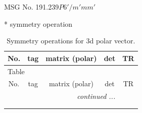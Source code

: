 \documentclass[fleqn,8pt]{jsarticle}
\begin{document}
\setcounter{MaxMatrixCols}{32}

\renewcommand{\tablename}{Table~}
\renewcommand{\figurename}{Figure~}
\begin{center}
\LARGE
MSG No. 191.239\quad$P6'/m'mm'$
\end{center}
* symmetry operation
\renewcommand{\arraystretch}{1.3}
\begin{longtable}{ccccc}
\caption{Symmetry operations for 3d polar vector.}
 \\
 \hline \hline
No. & tag & matrix (polar) & det & TR \\ \hline \endfirsthead

\multicolumn{4}{l}{\tablename\ \thetable{}} \\
 \hline \hline
No. & tag & matrix (polar) & det & TR \\ \hline \endhead

 \hline \hline
\multicolumn{4}{r}{\footnotesize\it continued ...} \\ \endfoot

 \hline \hline
\multicolumn{4}{r}{} \\ \endlastfoot


\end{longtable}
\end{document}
